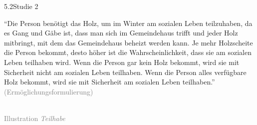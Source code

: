 \documentclass[xcolor=table,9pt,aspectratio=169]{beamer}
\begin{document}
\begin{frame}{\vspace*{10mm}5.2\hspace*{1em}Studie 2}
\begin{multicols}{2}
   \enquote{Die Person benötigt das Holz, um im Winter am sozialen Leben teilzuhaben, da es Gang und Gäbe ist, dass man sich im Gemeindehaus trifft und jeder Holz mitbringt, mit dem das Gemeindehaus beheizt werden kann. Je mehr Holzscheite die Person bekommt, desto höher ist die Wahrscheinlichkeit, dass sie am sozialen Leben teilhaben wird. Wenn die Person gar kein Holz bekommt, wird sie mit Sicherheit nicht am sozialen Leben teilhaben. Wenn die Person alles verfügbare Holz bekommt, wird sie mit Sicherheit am sozialen Leben teilhaben.}\\
   \medskip
   \textcolor{gray}{(Ermöglichungsformulierung)}
   \vfill
   \begin{center}
      \\
      \textcolor{gray}{Illustration \textit{Teilhabe}}
   \end{center}
\end{multicols}
\end{frame}
\end{document}
